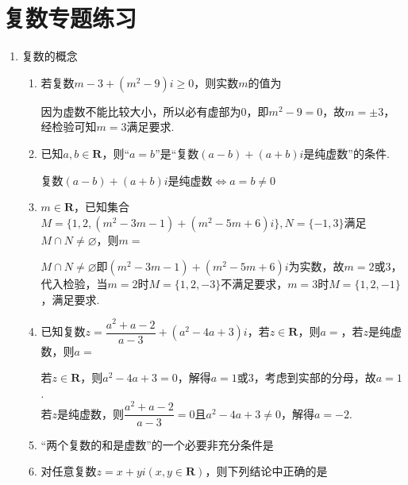 \chapter*{复数专题练习}
\begin{enumerate}
\item 复数的概念
\begin{enumerate}
    \item 若复数$m-3+(m^2-9)i \geq 0$，则实数$m$的值为
    \begin{jieda}
        因为虚数不能比较大小，所以必有虚部为0，即$m^2 - 9 = 0$，故$m = \pm 3$，经检验可知$m = 3$满足要求.
    \end{jieda}
    \item 已知$a, b \in \mathbf{R}$，则“$a = b$”是“复数$(a-b) + (a+b)i$是纯虚数”的条件.
    \begin{jieda}
        复数$(a-b) + (a+b)i$是纯虚数$\Longleftrightarrow a = b \neq 0$
    \end{jieda}
    \item $m \in \mathbf{R}$，已知集合$M = \{1, 2, (m^2-3m-1) + (m^2-5m+6)i\}, N = \{-1, 3\}$满足$M \cap N \neq \varnothing$，则$m = $
    \begin{jieda}
        $M \cap N \neq \varnothing$即$(m^2-3m-1) + (m^2-5m+6)i$为实数，故$m = 2$或$3$，代入检验，当$m = 2$时$M = \{1,2,-3\}$不满足要求，$m = 3$时$M = \{1,2,-1\}$，满足要求.
    \end{jieda}
    \item 已知复数$z = \dfrac{a^2+a-2}{a-3} + (a^2 - 4a+3)i$，若$z \in \mathbf{R}$，则$a = $，若$z$是纯虚数，则$a = $
    \begin{jieda}
        若$z \in \mathbf{R}$，则$a^2 - 4a+3 = 0$，解得$a = 1$或$3$，考虑到实部的分母，故$a = 1$. \\
        若$z$是纯虚数，则$\dfrac{a^2+a-2}{a-3} = 0$且$a^2-4a+3 \neq 0$，解得$a = -2$.
    \end{jieda}
    \item “两个复数的和是虚数”的一个必要非充分条件是
    \item 对任意复数$z = x + yi (x, y \in \mathbf{R})$，则下列结论中正确的是
    \begin{jieda}
        \begin{enumerate}[A.]

\end{enumerate}
\end{jieda}
\end{enumerate}
\end{enumerate}
